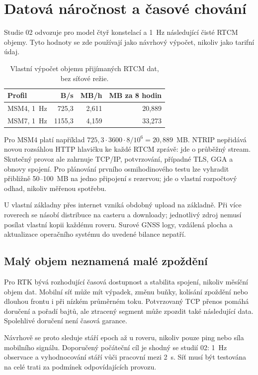 \documentclass[11pt,a4paper]{article}
\begin{document}
\section{Datová náročnost a časové chování}
Studie 02 odvozuje pro model čtyř konstelací a 1~Hz následující čisté RTCM objemy. Tyto hodnoty se zde používají jako návrhový výpočet, nikoliv jako tarifní údaj.
\par
\begin{table}[htbp]\centering\small
\caption{Vlastní výpočet objemu přijímaných RTCM dat, bez síťové režie.}
\begin{tabular}{lrrr}\toprule
Profil & B/s & MB/h & MB za 8 hodin\\\midrule
MSM4, 1~Hz & 725,3 & 2,611 & 20,889\\
MSM7, 1~Hz & 1155,3 & 4,159 & 33,273\\
\bottomrule\end{tabular}\end{table}
\par
Pro MSM4 platí například
$725{,}3\cdot3600\cdot8/10^6=20{,}889$~MB.
NTRIP nepřidává novou rozsáhlou HTTP hlavičku ke každé RTCM zprávě: jde o průběžný stream. Skutečný provoz ale zahrnuje TCP/IP, potvrzování, případné TLS, GGA a obnovy spojení. Pro plánování prvního osmihodinového testu lze vyhradit přibližně 50--100~MB na jedno připojení s rezervou; jde o vlastní rozpočtový odhad, nikoliv měřenou spotřebu.

U vlastní základny přes internet vzniká obdobný upload na základně. Při více roverech se násobí distribuce na casteru a downloady; jednotlivý zdroj nemusí posílat vlastní kopii každému roveru. Surové GNSS logy, vzdálená plocha a aktualizace operačního systému do uvedené bilance nepatří.

\subsection{Malý objem neznamená malé zpoždění}
Pro RTK bývá rozhodující časová dostupnost a stabilita spojení, nikoliv měsíční objem dat. Mobilní síť může mít výpadek, změnu buňky, kolísání zpoždění nebo dlouhou frontu i při nízkém průměrném toku. Potvrzovaný TCP přenos pomáhá doručení a pořadí bajtů, ale ztracený segment může zpozdit také následující data. Spolehlivé doručení není časová garance.

Návrhově se proto sleduje stáří epoch až u roveru, nikoliv pouze ping nebo síla mobilního signálu. Doporučený počáteční cíl je shodný se studií 02: 1~Hz observace a vyhodnocování stáří vůči pracovní mezi 2~s. Síť musí být testována na celé trati za podmínek odpovídajících provozu.
\end{document}
